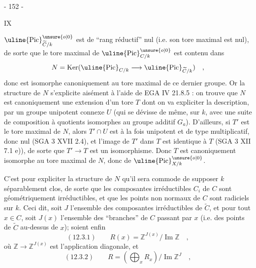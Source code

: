 
\begin{center}- 152 -\end{center}
\begin{flushright}IX\end{flushright}

$\uline{\operatorname{Pic}}^{\unsure{o|0}}_{\widetilde C/k}$ est de ``rang réductif'' nul (i.e. son tore maximal est nul), de sorte que le tore maximal de $\uline{\operatorname{Pic}}^{\unsure{o|0}}_{C/k}$ est contenu dans
\[
N=\operatorname{Ker}(\uline{\operatorname{Pic}}_{C/k}
\longrightarrow\uline{\operatorname{Pic}}_{\widetilde C/k})\quad,
\]
donc est isomorphe canoniquement au tore maximal de ce dernier groupe. Or la structure de $N$ s'explicite aisément à l'aide de EGA IV 21.8.5 : on trouve que $N$ est canoniquement une extension d'un tore $T$ dont on va expliciter la description, par un groupe unipotent connexe $U$ (qui se dévisse de même, sur $k$, avec une suite de composition à quotients isomorphes au groupe additif $G_a$). D'ailleurs, si $T'$ est le tore maximal de $N$, alors $T'\cap U$ est à la fois unipotent et de type multiplicatif, donc nul (SGA 3 XVII 2.4), et l'image de $T'$ dans $T$ est identique à $T$ (SGA 3 XII 7.1 e)), de sorte que $T'\longrightarrow T$ est un isomorphisme. Donc $T$ est canoniquement isomorphe au tore maximal de $N$, donc de $\uline{\operatorname{Pic}}^{\unsure{o|0}}_{X/k}$.

C'est pour expliciter la structure de $N$ qu'il sera commode de supposer $k$ séparablement clos, de sorte que les composantes irréductibles $C_i$ de $C$ sont géométriquement irréductibles, et que les points non normaux de $C$ sont radiciels sur $k$. Ceci dit, soit $J$ l'ensemble des composantes irréductibles de $\widetilde C$, et pour tout $x\in C$, soit $J(x)$ l'ensemble des ``branches'' de $C$ passant par $x$ (i.e. des points de $\widetilde C$ au-dessus de $x$); soient enfin
\[
(12.3.1)\qquad R(x)=\mathbb Z^{J(x)}/\operatorname{Im}\mathbb Z\quad,
\]
où $\mathbb Z\longrightarrow\mathbb Z^{J(x)}$ est l'application diagonale, et
\[
(12.3.2)\qquad R=(\bigoplus_x R_x)/\operatorname{Im}\mathbb Z^J\quad,
\]


